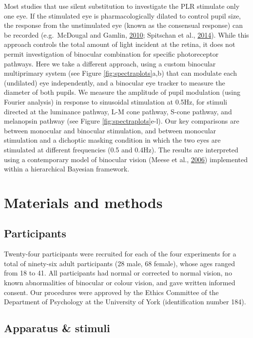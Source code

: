 \documentclass[
]{article}
\begin{document}
Most studies that use silent substitution to investigate the PLR stimulate only one eye. If the stimulated eye is pharmacologically dilated to control pupil size, the response from the unstimulated eye (known as the consensual response) can be recorded (e.g.~McDougal and Gamlin, \protect\hyperlink{ref-McDougal2010}{2010}; Spitschan et al., \protect\hyperlink{ref-Spitschan2014}{2014}). While this approach controls the total amount of light incident at the retina, it does not permit investigation of binocular combination for specific photoreceptor pathways. Here we take a different approach, using a custom binocular multiprimary system (see Figure \ref{fig:spectraplots}a,b) that can modulate each (undilated) eye independently, and a binocular eye tracker to measure the diameter of both pupils. We measure the amplitude of pupil modulation (using Fourier analysis) in response to sinusoidal stimulation at 0.5Hz, for stimuli directed at the luminance pathway, L-M cone pathway, S-cone pathway, and melanopsin pathway (see Figure \ref{fig:spectraplots}e-l). Our key comparisons are between monocular and binocular stimulation, and between monocular stimulation and a dichoptic masking condition in which the two eyes are stimulated at different frequencies (0.5 and 0.4Hz). The results are interpreted using a contemporary model of binocular vision (Meese et al., \protect\hyperlink{ref-Meese2006}{2006}) implemented within a hierarchical Bayesian framework.

\hypertarget{materials-and-methods}{%
\section{Materials and methods}\label{materials-and-methods}}

\hypertarget{participants}{%
\subsection{Participants}\label{participants}}

Twenty-four participants were recruited for each of the four experiments for a total of ninety-six adult participants (28 male, 68 female), whose ages ranged from 18 to 41. All participants had normal or corrected to normal vision, no known abnormalities of binocular or colour vision, and gave written informed consent. Our procedures were approved by the Ethics Committee of the Department of Psychology at the University of York (identification number 184).

\hypertarget{apparatus-stimuli}{%
\subsection{Apparatus \& stimuli}\label{apparatus-stimuli}}
\end{document}
